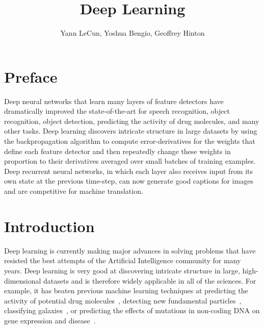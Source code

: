 \documentclass[]{article}
\title{Deep Learning}
\author{Yann LeCun, Yoshua Bengio, Geoffrey Hinton}
\begin{document}
\maketitle

\section{Preface}

Deep neural networks that learn many layers of feature detectors have
dramatically improved the state-of-the-art for speech recognition, object
recognition, object detection, predicting the activity of drug molecules,
and many other tasks. Deep learning discovers intricate structure in large
datasets by using the backpropagation algorithm to compute
error-derivatives for the weights that define each feature detector and
then repeatedly change these weights in proportion to their derivatives
averaged over small batches of training examples.  Deep recurrent neural
networks, in which each layer also receives input from its own state at the
previous time-step, can now generate good captions for images and are
competitive for machine translation.

\section{Introduction}

Deep learning is currently making major advances in solving problems that
have resisted the best attempts of the Artificial Intelligence community
for many years. Deep learning is very good at discovering intricate
structure in large, high-dimensional datasets and is therefore widely
applicable in all of the sciences. For example, it has beaten previous
machine learning techniques at predicting the activity of potential drug
molecules~\citep{Dahl}, detecting new fundamental particles~\citep{particles},
classifying galaxies~\citep{??}, or predicting the effects of mutations in
non-coding DNA on gene expression and disease~\citep{Frey}.
\end{document}
